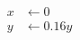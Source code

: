 \documentclass[preview]{standalone}
\begin{document}
\begin{align*}
x &\leftarrow 0 \\ y &\leftarrow 0.16 y
\end{align*}
\end{document}
